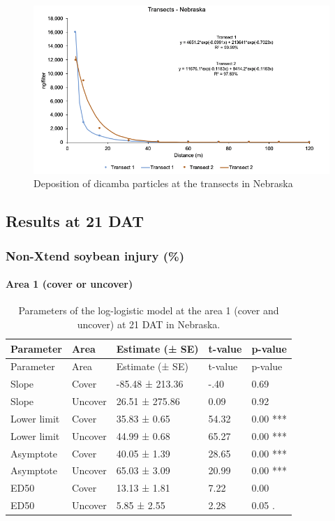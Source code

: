 \documentclass[]{article}
\let\oldparagraph\paragraph
\renewcommand{\paragraph}[1]{\oldparagraph{#1}\mbox{}}
\begin{document}
\begin{figure}[h]

{\centering \includegraphics[width=1\linewidth]{Ntransect} 

}

\caption{Deposition of dicamba particles at the transects in Nebraska}\label{fig:unnamed-chunk-65}
\end{figure}

\pagebreak
\newpage

\subsection{Results at 21 DAT}\label{results-at-21-dat-2}

\subsubsection{Non-Xtend soybean injury
(\%)}\label{non-xtend-soybean-injury}

\paragraph{Area 1 (cover or uncover)}\label{area-1-cover-or-uncover}

\begin{longtable}[]{@{}lllll@{}}
\caption{Parameters of the log-logistic model at the area 1 (cover and
uncover) at 21 DAT in Nebraska.}\tabularnewline
\toprule
Parameter & Area & Estimate (± SE) & t-value & p-value\tabularnewline
\midrule
\endfirsthead
\toprule
Parameter & Area & Estimate (± SE) & t-value & p-value\tabularnewline
\midrule
\endhead
Slope & Cover & -85.48 ± 213.36 & -.40 & 0.69\tabularnewline
Slope & Uncover & 26.51 ± 275.86 & 0.09 & 0.92\tabularnewline
Lower limit & Cover & 35.83 ± 0.65 & 54.32 & 0.00 ***\tabularnewline
Lower limit & Uncover & 44.99 ± 0.68 & 65.27 & 0.00 ***\tabularnewline
Asymptote & Cover & 40.05 ± 1.39 & 28.65 & 0.00 ***\tabularnewline
Asymptote & Uncover & 65.03 ± 3.09 & 20.99 & 0.00 ***\tabularnewline
ED50 & Cover & 13.13 ± 1.81 & 7.22 & 0.00\tabularnewline
ED50 & Uncover & 5.85 ± 2.55 & 2.28 & 0.05 .\tabularnewline
\bottomrule
\end{longtable}
\end{document}
